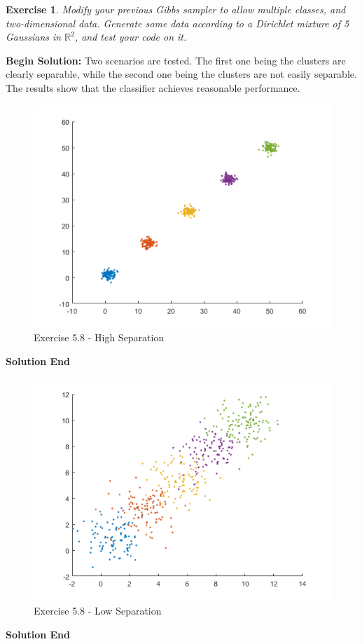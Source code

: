 \documentclass[twoside]{article}
\newcounter{lecnum}
\newtheorem{exercise}{Exercise}[lecnum]
\begin{document}
 \begin{exercise}
   Modify your previous Gibbs sampler to allow multiple classes, and two-dimensional data. Generate some data according to a Dirichlet mixture of 5 Gaussians in $\mathbb{R}^2$, and test your code on it.

\end{exercise}

\textbf{Begin Solution:}
Two scenarios are tested. The first one being the clusters are clearly separable, while the second one being the clusters are not easily separable. The results show that the classifier achieves reasonable performance.
\begin{figure}[H]
\begin{center}
\includegraphics[width=\textwidth]{./exercise_5_7/50.png}
\end{center}
\caption{Exercise 5.8 - High Separation}
\end{figure} 
\textbf{Solution End}
\begin{figure}[H]
\begin{center}
\includegraphics[width=\textwidth]{./exercise_5_7/10.png}
\end{center}
\caption{Exercise 5.8 - Low Separation}
\end{figure} 
\textbf{Solution End}
\end{document}
